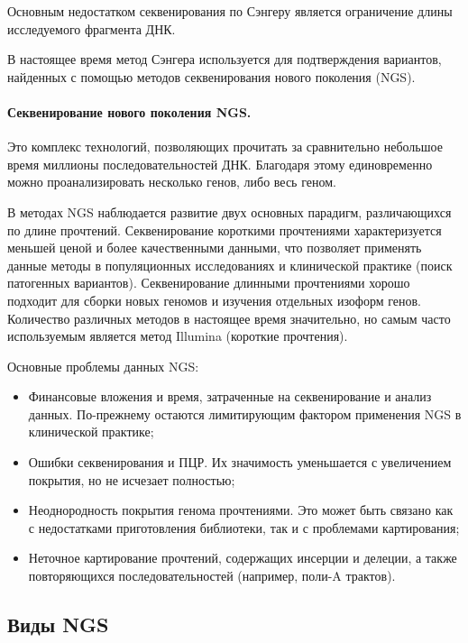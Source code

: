 \documentclass[a4paper,12pt]{article}
\begin{document}
Основным недостатком секвенирования по Сэнгеру является ограничение длины исследуемого фрагмента ДНК.

В настоящее время метод Сэнгера используется для подтверждения вариантов, найденных с помощью методов секвенирования нового поколения (NGS).

\paragraph{Секвенирование нового поколения NGS.}
Это комплекс технологий, позволяющих прочитать за сравнительно небольшое время миллионы последовательностей ДНК.
Благодаря этому единовременно можно проанализировать несколько генов, либо весь геном.

В методах NGS наблюдается развитие двух основных парадигм, различающихся по длине прочтений.
Секвенирование короткими прочтениями характеризуется меньшей ценой и более качественными данными, что позволяет применять данные методы в популяционных исследованиях и клинической практике (поиск патогенных вариантов).
Секвенирование длинными прочтениями хорошо подходит для сборки новых геномов и изучения отдельных изоформ генов\cite{goodwin}.
Количество различных методов в настоящее время значительно, но самым часто используемым является метод Illumina (короткие прочтения).

Основные проблемы данных NGS:

\begin{itemize}
\item Финансовые вложения и время, затраченные на секвенирование и анализ данных.
По-прежнему остаются лимитирующим фактором применения NGS в клинической практике;
\item Ошибки секвенирования и ПЦР.
Их значимость уменьшается с увеличением покрытия, но не исчезает полностью;
\item Неоднородность покрытия генома прочтениями.
Это может быть связано как с недостатками приготовления библиотеки, так и с проблемами картирования;
\item Неточное картирование прочтений, содержащих инсерции и делеции, а также повторяющихся последовательностей (например, поли-A трактов).
\end{itemize}

\subsection{Виды NGS}
\end{document}
